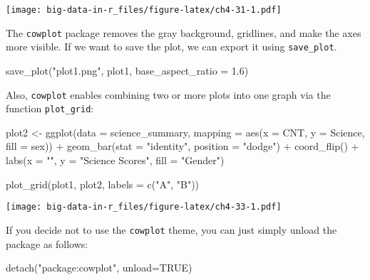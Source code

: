 \documentclass[
]{book}
\newenvironment{Shaded}{\begin{snugshade}}{\end{snugshade}}
\newcommand{\AttributeTok}[1]{\textcolor[rgb]{0.77,0.63,0.00}{#1}}
\newcommand{\ConstantTok}[1]{\textcolor[rgb]{0.00,0.00,0.00}{#1}}
\newcommand{\FloatTok}[1]{\textcolor[rgb]{0.00,0.00,0.81}{#1}}
\newcommand{\FunctionTok}[1]{\textcolor[rgb]{0.00,0.00,0.00}{#1}}
\newcommand{\NormalTok}[1]{#1}
\newcommand{\OtherTok}[1]{\textcolor[rgb]{0.56,0.35,0.01}{#1}}
\newcommand{\SpecialCharTok}[1]{\textcolor[rgb]{0.00,0.00,0.00}{#1}}
\newcommand{\StringTok}[1]{\textcolor[rgb]{0.31,0.60,0.02}{#1}}
\begin{document}
\texttt{[image: big-data-in-r\_files/figure-latex/ch4-31-1.pdf]}

The \texttt{cowplot} package removes the gray background, gridlines, and make the axes more visible. If we want to save the plot, we can export it using \texttt{save\_plot}.

\begin{Shaded}
\begin{Highlighting}[]
\FunctionTok{save\_plot}\NormalTok{(}\StringTok{"plot1.png"}\NormalTok{, plot1,}
          \AttributeTok{base\_aspect\_ratio =} \FloatTok{1.6}\NormalTok{)}
\end{Highlighting}
\end{Shaded}

Also, \texttt{cowplot} enables combining two or more plots into one graph via the function \texttt{plot\_grid}:

\begin{Shaded}
\begin{Highlighting}[]
\NormalTok{plot2 }\OtherTok{\textless{}{-}} 
  \FunctionTok{ggplot}\NormalTok{(}\AttributeTok{data =}\NormalTok{ science\_summary,}
         \AttributeTok{mapping =} \FunctionTok{aes}\NormalTok{(}\AttributeTok{x =}\NormalTok{ CNT, }\AttributeTok{y =}\NormalTok{ Science, }\AttributeTok{fill =}\NormalTok{ sex)) }\SpecialCharTok{+}
  \FunctionTok{geom\_bar}\NormalTok{(}\AttributeTok{stat =} \StringTok{"identity"}\NormalTok{, }\AttributeTok{position =} \StringTok{"dodge"}\NormalTok{) }\SpecialCharTok{+}
  \FunctionTok{coord\_flip}\NormalTok{() }\SpecialCharTok{+}
  \FunctionTok{labs}\NormalTok{(}\AttributeTok{x =} \StringTok{""}\NormalTok{, }\AttributeTok{y =} \StringTok{"Science Scores"}\NormalTok{, }\AttributeTok{fill =} \StringTok{"Gender"}\NormalTok{) }


\FunctionTok{plot\_grid}\NormalTok{(plot1, plot2, }\AttributeTok{labels =} \FunctionTok{c}\NormalTok{(}\StringTok{"A"}\NormalTok{, }\StringTok{"B"}\NormalTok{))}
\end{Highlighting}
\end{Shaded}

\texttt{[image: big-data-in-r\_files/figure-latex/ch4-33-1.pdf]}

If you decide not to use the \texttt{cowplot} theme, you can just simply unload the package as follows:

\begin{Shaded}
\begin{Highlighting}[]
\FunctionTok{detach}\NormalTok{(}\StringTok{"package:cowplot"}\NormalTok{, }\AttributeTok{unload=}\ConstantTok{TRUE}\NormalTok{)}
\end{Highlighting}
\end{Shaded}
\end{document}
